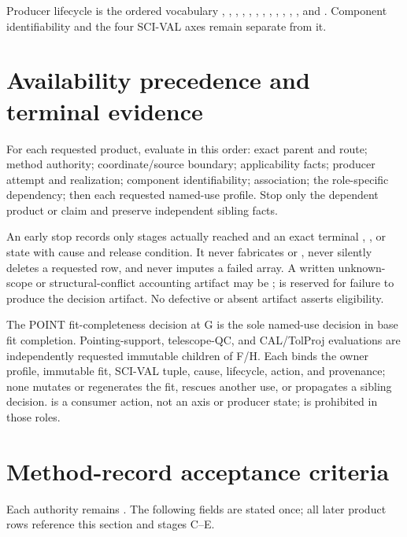 \documentclass[11pt]{article}
\begin{document}
Producer lifecycle is the ordered vocabulary ,
, , , ,
, , ,
, , ,
, and . Component identifiability and the
four SCI-VAL axes remain separate from it.

\section{Availability precedence and terminal evidence}

For each requested product, evaluate in this order: exact parent and route;
method authority; coordinate/source boundary; applicability facts; producer
attempt and realization; component identifiability; association; the
role-specific dependency; then each requested named-use profile. Stop only the
dependent product or claim and preserve independent sibling facts.

An early stop records only stages actually reached and an exact terminal
, , or  state with cause and
release condition. It never fabricates  or
, never silently deletes a requested row, and never imputes
a failed array. A written unknown-scope or structural-conflict accounting
artifact may be ;  is reserved for failure to
produce the decision artifact. No defective or absent artifact asserts
eligibility.

The POINT fit-completeness decision at G is the sole named-use decision in base
fit completion. Pointing-support, telescope-QC, and CAL/TolProj evaluations
are independently requested immutable children of F/H. Each binds the owner
profile, immutable fit, SCI-VAL tuple, cause, lifecycle, action, and provenance;
none mutates or regenerates the fit, rescues another use, or propagates a
sibling decision.  is a consumer action, not an
axis or producer state;  is prohibited in those roles.

\section{Method-record acceptance criteria}

Each authority remains .
The following fields are stated once; all later product rows reference this
section and stages C--E.
\end{document}
